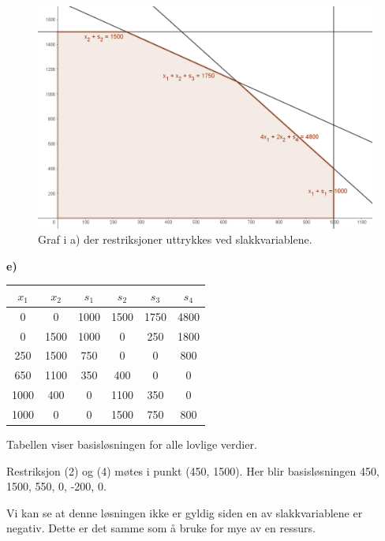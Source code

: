 \documentclass{article}
\begin{document}
    
    \begin{figure}[ht]
        \centering
        \includegraphics*[width=\linewidth]{img/1d.PNG}
        \caption*{Graf i a) der restriksjoner uttrykkes ved slakkvariablene.}
    \end{figure}

    \small\textbf{e)}
    
    \begin{table}[h!]
        \centering
        \begin{tabular}{|c|c|c|c|c|c|}
            \hline
            $x_1$ & $x_2 $ & $s_1$ & $s_2$ & $s_3$ & $s_4$ \\\hline
            0 & 0 & 1000 & 1500 & 1750 & 4800 \\\hline
            0 & 1500 & 1000 & 0 & 250 & 1800 \\\hline
            250 & 1500 & 750 & 0 & 0 & 800 \\\hline
            650 & 1100 & 350 & 400 & 0 & 0 \\\hline
            1000 & 400 & 0 & 1100 & 350 & 0 \\\hline
            1000 & 0 & 0 & 1500 & 750 & 800 \\\hline
        \end{tabular}
    \end{table}
    
    Tabellen viser basisløsningen for alle lovlige verdier. 
    
    Restriksjon (2) og (4) møtes i punkt (450, 1500). Her blir basisløsningen 450, 1500, 550, 0, -200, 0.
    
    Vi kan se at denne løsningen ikke er gyldig siden en av slakkvariablene er negativ. Dette er det samme som å bruke for mye av en ressurs. 
\end{document}
